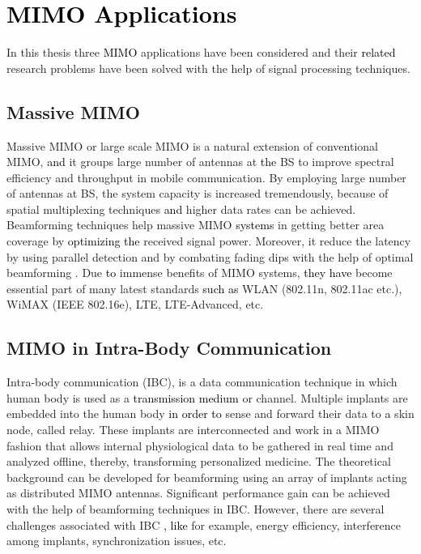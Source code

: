 {\section{\textcolor{black}{MIMO Applications} }
In this thesis three \textcolor{black}{MIMO} applications have been considered and their \textcolor{black}{related} research problems have been solved with the help of signal processing techniques.
 \subsection{Massive MIMO}
 Massive MIMO or large scale MIMO is a natural extension of conventional MIMO, \textcolor{black}{and} it groups large number of antennas at \textcolor{black}{the }BS to improve spectral efficiency and throughput in mobile communication. By employing large number of antennas at BS,  the system capacity is increased tremendously, because of spatial multiplexing techniques \textcolor{black}{and }higher data rates can be achieved. Beamforming techniques help massive MIMO \textcolor{black}{systems} in getting better area coverage by \textcolor{black}{optimizing the} received signal power. Moreover, it reduce the latency by using parallel detection\cite{latency} and by combating fading dips with the help of optimal beamforming \cite{magazine_eric}.
 Due \textcolor{black}{to} immense benefits of MIMO systems, \textcolor{black}{they have} become essential  part of many latest standards \textcolor{black}{such as} WLAN (802.11n, 802.11ac etc.), WiMAX (IEEE 802.16e), LTE, LTE-Advanced, etc.
 \subsection{MIMO in Intra-Body Communication}
  Intra-body communication (IBC), is a data communication technique in which human body is used as a \textcolor{black}{transmission medium} or channel. Multiple implants are embedded into the human body \textcolor{black}{in order to} sense and forward their data to \textcolor{black}{a} skin node, called relay. These implants are interconnected and work in a MIMO fashion that allows internal physiological data to be gathered in real time and analyzed offline, thereby, transforming personalized medicine.
   The theoretical background can be developed for
   beamforming using an array of implants acting as distributed MIMO antennas. Significant performance gain can be achieved with the help of beamforming techniques in IBC. However, there are several challenges associated with IBC \textcolor{black}{, like} for example, energy efficiency, interference among implants, synchronization issues, etc.  
}

